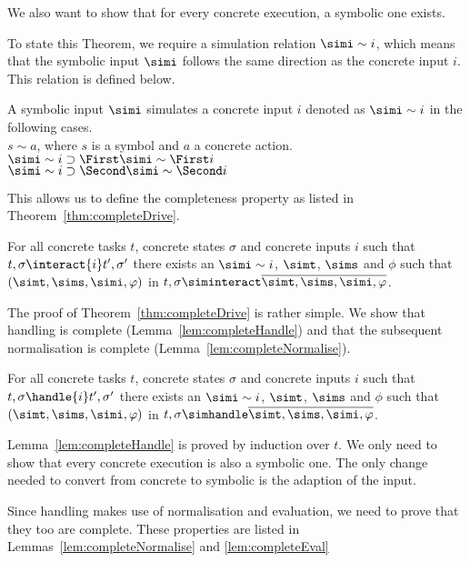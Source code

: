 We also want to show that for every concrete execution, a symbolic one exists.

To state this Theorem, we require a simulation relation $\simi\sim i$, which means that the symbolic input $\simi$ follows the same direction as the concrete input $i$.
This relation is defined below.

\begin{definition}
  A symbolic input $\simi$ simulates a concrete input $i$ denoted as $\simi\sim i$ in the following cases.\\
  $s\sim a$, where $s$ is a symbol and $a$ a concrete action.\\
  $\simi\sim i\implies \First \simi \sim \First i$\\
  $\simi\sim i\implies \Second \simi \sim \Second i$
\end{definition}

This allows us to define the completeness property as listed in Theorem~\ref{thm:completeDrive}.

\begin{theorem}
  \label{thm:completeDrive}
  For all concrete tasks $t$, concrete states $\sigma$ and concrete inputs $i$ such that $t,\sigma \interact{i} t',\sigma'$
there exists an $\simi\sim i$, $\simt$, $\sims$ and $\phi$ such that $(\simt,\sims,\simi,\phi)$ in $t,\sigma\siminteract \overline{\simt,\sims,\simi,\phi}$.
\end{theorem}


The proof of Theorem~\ref{thm:completeDrive} is rather simple.
We show that handling is complete (Lemma~\ref{lem:completeHandle})
and that the subsequent normalisation is complete (Lemma~\ref{lem:completeNormalise}).


\begin{lemma}
  \label{lem:completeHandle}
  For all concrete tasks $t$, concrete states $\sigma$ and concrete inputs $i$ such that $t,\sigma \handle{i} t',\sigma'$
  there exists an $\simi\sim i$, $\simt$, $\sims$ and $\phi$ such that $(\simt,\sims,\simi,\phi)$ in $t,\sigma\simhandle \overline{\simt,\sims,\simi,\phi}$.
\end{lemma}

Lemma~\ref{lem:completeHandle} is proved by induction over $t$.
We only need to show that every concrete execution is also a symbolic one.
The only change needed to convert from concrete to symbolic is the adaption of the input.

Since handling makes use of normalisation and evaluation, we need to prove that they too are complete.
These properties are listed in Lemmas~\ref{lem:completeNormalise} and \ref{lem:completeEval}

